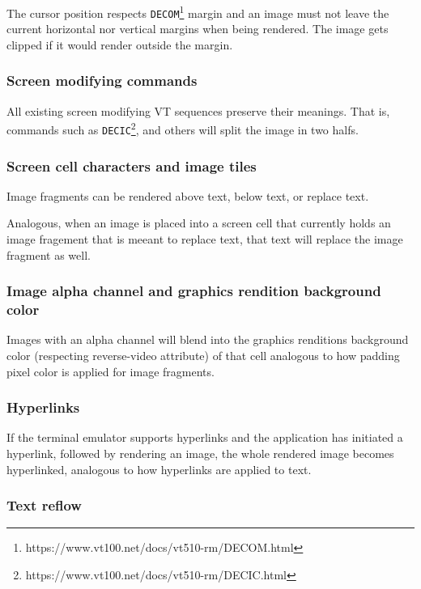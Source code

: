 \documentclass[a4paper]{article}
\newcommand{\code}[1]{\colorbox{light-gray}{\texttt{#1}}}
\begin{document}
The cursor position respects
\code{DECOM}\footnote{https://www.vt100.net/docs/vt510-rm/DECOM.html}
margin and an image must not leave the current horizontal nor vertical margins
when being rendered.
The image gets clipped if it would render outside the margin.

\subsubsection*{Screen modifying commands}

All existing screen modifying VT sequences preserve their meanings.
That is, commands such as
\code{DECIC}\footnote{https://www.vt100.net/docs/vt510-rm/DECIC.html},
and others will split the image in two halfs.

\subsubsection*{Screen cell characters and image tiles}

Image fragments can be rendered above text, below text, or replace text.

Analogous, when an image is placed into a screen cell that currently holds
an image fragement that is meeant to replace text,
that text will replace the image fragment as well.

\subsubsection*{Image alpha channel and graphics rendition background color}

Images with an alpha channel will blend into the graphics renditions
background color (respecting reverse-video attribute) of that cell analogous
to how padding pixel color is applied for image fragments.

\subsubsection*{Hyperlinks}

If the terminal emulator supports hyperlinks and the application has initiated
a hyperlink, followed by rendering an image, the whole rendered image becomes
hyperlinked, analogous to how hyperlinks are applied to text.

\subsubsection*{Text reflow}
\end{document}
